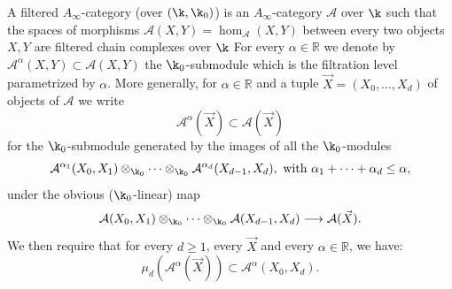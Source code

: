 A filtered $A_{\infty}$-category (over $(\k,\k_0)$) is an
$A_{\infty}$-category $\mathcal{A}$ over $\k$ such that the spaces of
morphisms $\mathcal{A}(X, Y) = \hom_{\mathcal{A}}(X, Y)$ between every
two objects $X, Y$ are filtered chain complexes over $\k$
For every
$\alpha \in \mathbb{R}$ we denote by
$\mathcal{A}^{\alpha}(X,Y) \subset \mathcal{A}(X,Y)$ the
$\k_0$-submodule which is the filtration level parametrized by
$\alpha$. More generally, for $\alpha \in \mathbb{R}$ and a tuple
$\vec{X} = (X_0, \ldots, X_d)$ of objects of $\mathcal{A}$ we write
$$\mathcal{A}^\alpha(\vec{X}) \subset \mathcal{A}(\vec{X})$$ for the
$\k_0$-submodule generated by the images of all the $\k_0$-modules
$$\mathcal{A}^{\alpha_1}(X_0, X_1) \otimes_{\k_0} \cdots \otimes_{\k_0}
\mathcal{A}^{\alpha_d}(X_{d-1}, X_d), \text{ with } \alpha_1 + \cdots
+ \alpha_d \leq \alpha,$$ under the obvious ($\k_0$-linear) map
$$\mathcal{A}(X_0, X_1) \otimes_{\k_0} \cdots \otimes_{\k_0}
\mathcal{A}(X_{d-1}, X_d) \longrightarrow \mathcal{A}(\vec{X}).$$ We
then require that for every $d \geq 1$, every $\vec{X}$ and every
$\alpha \in \mathbb{R}$, we have:
$$\mu_d (\mathcal{A}^{\alpha}(\vec{X}))
\subset \mathcal{A}^{\alpha}(X_0, X_d).$$


